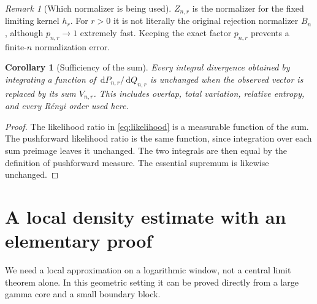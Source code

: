 \documentclass[11pt,oneside]{article}
\numberwithin{equation}{section}
\theoremstyle{plain}
\newtheorem{corollary}[theorem]{Corollary}
\theoremstyle{definition}
\theoremstyle{remark}
\newtheorem{remark}[theorem]{Remark}
\newcommand{\dd}{\,\mathrm d}
\begin{document}
\begin{remark}[Which normalizer is being used]
$Z_{n,r}$ is the normalizer for the fixed limiting kernel $h_r$.
For $r>0$ it is not literally the original rejection normalizer $B_n$,
although $p_{n,r}\to1$ extremely fast. Keeping the exact factor
$p_{n,r}$ prevents a finite-$n$ normalization error.
\end{remark}

\begin{corollary}[Sufficiency of the sum]\label{cor:sufficiency}
Every integral divergence obtained by integrating a function of
$\dd P_{n,r}/\dd Q_{n,r}$ is unchanged when the observed vector is
replaced by its sum $V_{n,r}$. This includes overlap, total variation,
relative entropy, and every R\'enyi order used here.
\end{corollary}
\begin{proof}
The likelihood ratio in \eqref{eq:likelihood} is a measurable function
of the sum. The pushforward likelihood ratio is the same function,
since integration over each sum preimage leaves it unchanged. The two
integrals are then equal by the definition of pushforward measure.
The essential supremum is likewise unchanged.
\end{proof}

\section{A local density estimate with an elementary proof}
\label{sec:local}
We need a local approximation on a logarithmic window, not a central
limit theorem alone. In this geometric setting it can be proved directly
from a large gamma core and a small boundary block.
\end{document}

